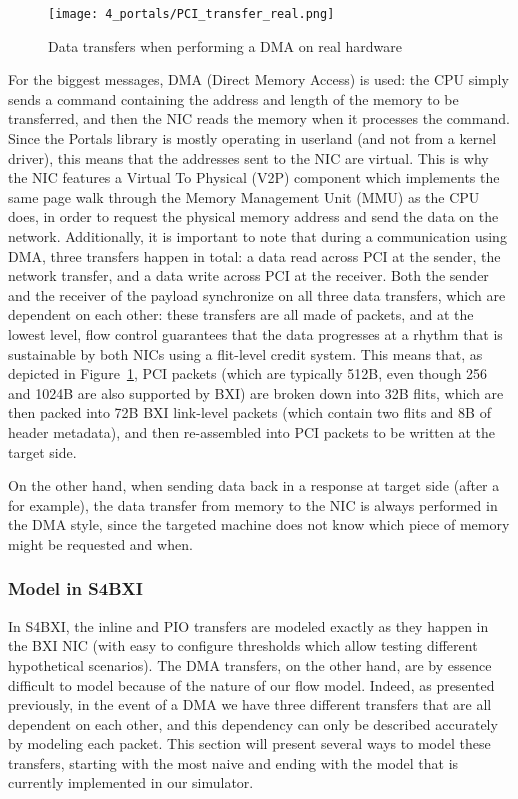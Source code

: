 \begin{figure}[!ht]
    \centering
    \texttt{[image: 4\_portals/PCI\_transfer\_real.png]}
    \caption{Data transfers when performing a DMA on real hardware}
    \label{fig:4_portals:PCI_transfer_real}
\end{figure}

For the biggest messages, DMA (Direct Memory Access) is used: the CPU simply
sends a command containing the address and length of the memory to be
transferred, and then the NIC reads the memory when it processes the command.
Since the Portals library is mostly operating in userland (and not from a kernel
driver), this means that the addresses sent to the NIC are virtual. This is why
the NIC features a Virtual To Physical (V2P) component which implements the same
page walk through the Memory Management Unit (MMU) as the CPU does, in order to
request the physical memory address and send the data on the network.
Additionally, it is important to note that during a communication using DMA,
three transfers happen in total: a data read across PCI at the sender, the
network transfer, and a data write across PCI at the receiver. Both the sender
and the receiver of the payload synchronize on all three data transfers, which
are dependent on each other: these transfers are all made of packets, and at the
lowest level, flow control guarantees that the data progresses at a rhythm that
is sustainable by both NICs using a flit-level credit system. This means that,
as depicted in Figure~\ref{fig:4_portals:PCI_transfer_real}, PCI packets (which
are typically 512B, even though 256 and 1024B are also supported by BXI) are
broken down into 32B flits, which are then packed into 72B BXI link-level
packets (which contain two flits and 8B of header metadata), and then
re-assembled into PCI packets to be written at the target side.

On the other hand, when sending data back in a response at target side (after a
 for example), the data transfer from memory to the NIC is
always performed in the DMA style, since the targeted machine does not know
which piece of memory might be requested and when.

\subsubsection{Model in S4BXI}

In S4BXI, the inline and PIO transfers are modeled exactly as they happen in the
BXI NIC (with easy to configure thresholds which allow testing different
hypothetical scenarios). The DMA transfers, on the other hand, are by essence
difficult to model because of the nature of our flow model. Indeed, as presented
previously, in the event of a DMA we have three different transfers that are all
dependent on each other, and this dependency can only be described accurately by
modeling each packet. This section will present several ways to model these
transfers, starting with the most naive and ending with the model that is
currently implemented in our simulator.

